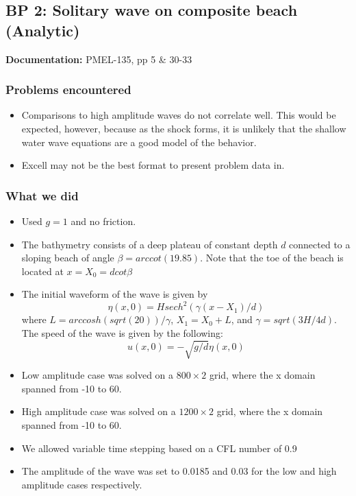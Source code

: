 \newsection

\subsection{BP 2:
 Solitary wave on composite beach (Analytic)}

{\bf Documentation:}  PMEL-135, pp 5 \& 30-33

\subsubsection{Problems encountered}

\begin{itemize}
\item Comparisons to high amplitude waves do not correlate well. This would be expected, however, because as the shock forms, it is unlikely that the shallow water wave equations are a good model of the behavior.
\item Excell may not be the best format to present problem data in. 
\end{itemize}

\subsubsection{What we did}

\begin{itemize}
\item Used $g=1$ and no friction.
\item The bathymetry consists of a deep plateau of constant depth $d$ connected to a sloping beach of angle $\beta = arccot(19.85)$. Note that the toe of the beach is located at $x = X_0 = d cot \beta$
\item The initial waveform of the wave is given by 
\begin{equation}
\eta(x,0) = H sech^2(\gamma (x - X_1)/d)
\end{equation}
where $L = arccosh(sqrt(20))/\gamma$, $X_1 = X_0 + L$, and $\gamma = sqrt(3H/4d)$. The speed of the wave is given by the following: 
\begin{equation}
u(x,0)=-\sqrt{g/d}\eta(x,0)
\end{equation}
\item Low amplitude case was solved on a $800\times 2$ grid, where the x domain spanned from -10 to 60.
\item High amplitude case was solved on a $1200\times 2$ grid, where the x domain spanned from -10 to 60.
\item We allowed variable time stepping based on a CFL number of 0.9
\item The amplitude of the wave was set to 0.0185 and 0.03 for the low and high amplitude cases respectively. 
\end{itemize} 


